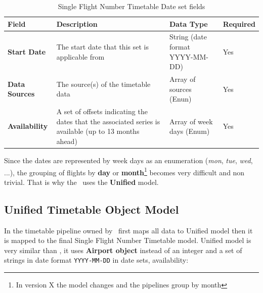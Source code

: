 \begin{table}[H]
\centering
\begin{tabular}{|>{\raggedright\arraybackslash}p{2.5cm}|>{\raggedright\arraybackslash}p{5.2cm}|>{\raggedright\arraybackslash}p{2.5cm}|>{\raggedright\arraybackslash}p{2cm}|}
\hline
\textbf{Field}        & \textbf{Description}                                                                                  & \textbf{Data Type}              & \textbf{Required} \\ \hline
\textbf{Start Date}   & The start date that this set is applicable from                                                       & String (date format YYYY-MM-DD) & Yes               \\ \hline
\textbf{Data Sources} & The source(s) of the timetable data                                                                   & Array of sources (Enun)         & Yes               \\ \hline
\textbf{Availability} & A set of offsets indicating the dates that the associated series is available (up to 13 months ahead) & Array of week days (Enum)       & Yes               \\ \hline
\end{tabular}
\caption{Single Flight Number Timetable Date set fields}
\label{sfn-date-set}
\end{table}

Since the dates are represented by week days as an enumeration (\textit{mon}, \textit{tue}, \textit{wed}, ...), the grouping of flights by \textbf{day} or \textbf{month}\footnote{In version X the model changes and the pipelines group by month} becomes very difficult and non trivial. That is why the \thesis\ uses the \textbf{Unified} model.

\subsection{Unified Timetable Object Model} \label{unified-model}

In the timetable pipeline owned by \squad\ first maps all data to Unified model then it is mapped to the final Single Flight Number Timetable model. Unified model is very similar than , it uses \textbf{Airport object} instead of an integer and a set of strings in date format \texttt{YYYY-MM-DD} in date sets, availability:

